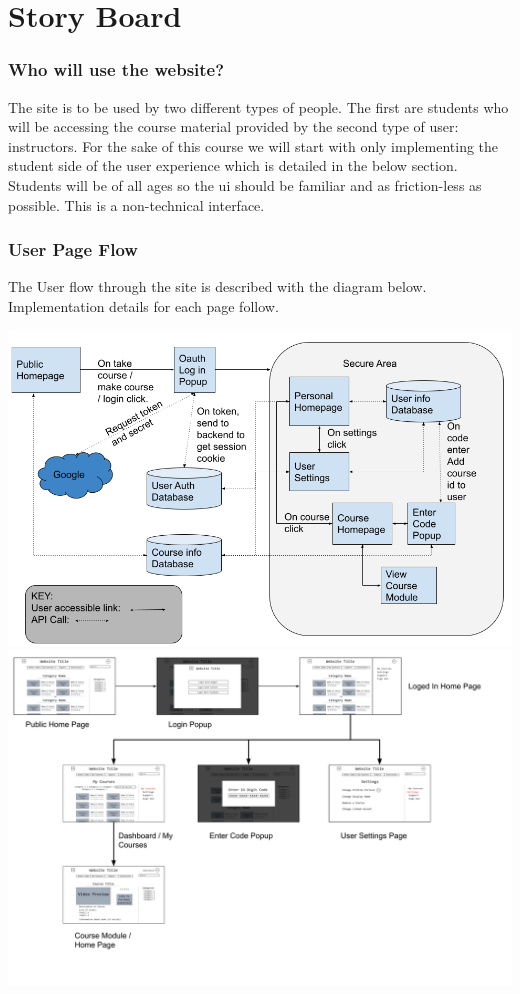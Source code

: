 \documentclass{article}
\begin{document}
\section{Story Board}
\subsubsection{Who will use the website?}
The site is to be used by two different types of people. The first are students
who will be accessing the course material provided by the second type of user:
instructors. For the sake of this course we will start with only implementing
the student side of the user experience which is detailed in the below section.
Students will be of all ages so the ui should be familiar and as friction-less as
possible. This is a non-technical interface.

\subsubsection{User Page Flow}
The User flow through the site is described with the diagram below.
Implementation details for each page follow.

\includegraphics[width=\textwidth]{flow}
\includegraphics[width=\textwidth]{flow2}
\end{document}
